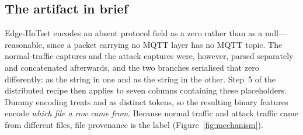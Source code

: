 \subsection{The artifact in brief}

Edge-IIoTset encodes an absent protocol field as a zero rather than as a
null---reasonable, since a packet carrying no MQTT layer has no MQTT topic. The
normal-traffic captures and the attack captures were, however, parsed
separately and concatenated afterwards, and the two branches serialised that
zero differently: as the string  in one and as the string  in
the other. Step~5 of the distributed recipe then applies
 to seven columns containing these placeholders.
Dummy encoding treats  and  as distinct tokens, so the
resulting binary features encode \emph{which file a row came from}. Because
normal traffic and attack traffic came from different files, file provenance is
the label (Figure~\ref{fig:mechanism}).

